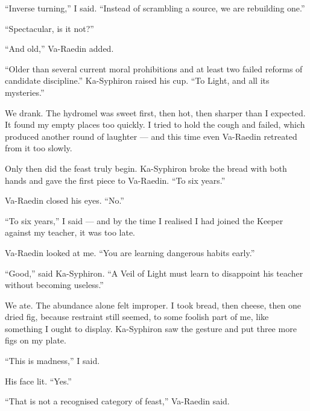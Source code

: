 ``Inverse turning,'' I said. ``Instead of scrambling a source, we are rebuilding one.''\par

``Spectacular, is it not?''\par

``And old,'' Va-Raedin added.\par

``Older than several current moral prohibitions and at least two failed reforms of candidate discipline.'' Ka-Syphiron raised his cup. ``To Light, and all its mysteries.''\par

We drank.
The hydromel was sweet first, then hot, then sharper than I expected. It found my empty places too quickly. I tried to hold the cough and failed, which produced another round of laughter --- and this time even Va-Raedin retreated from it too slowly.\par

Only then did the feast truly begin.
Ka-Syphiron broke the bread with both hands and gave the first piece to Va-Raedin. ``To six years.''\par

Va-Raedin closed his eyes. ``No.''\par

``To six years,'' I said --- and by the time I realised I had joined the Keeper against my teacher, it was too late.\par

Va-Raedin looked at me. ``You are learning dangerous habits early.''\par

``Good,'' said Ka-Syphiron. ``A Veil of Light must learn to disappoint his teacher without becoming useless.''\par

We ate. The abundance alone felt improper.
I took bread, then cheese, then one dried fig, because restraint still seemed, to some foolish part of me, like something I ought to display. Ka-Syphiron saw the gesture and put three more figs on my plate.\par

``This is madness,'' I said.\par

His face lit. ``Yes.''\par

``That is not a recognised category of feast,'' Va-Raedin said.\par

